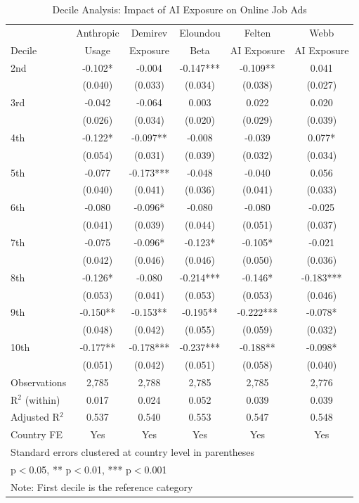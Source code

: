 \documentclass[11pt]{article}
\begin{document}
\begin{table}[H]
\centering
\caption{Decile Analysis: Impact of AI Exposure on Online Job Ads}
\begin{tabular}{lccccc}
\hline\hline
 & Anthropic & Demirev & Eloundou & Felten & Webb \\
Decile & Usage & Exposure & Beta & AI Exposure & AI Exposure \\
\midrule
2nd & -0.102* & -0.004 & -0.147*** & -0.109** & 0.041 \\
 & (0.040) & (0.033) & (0.034) & (0.038) & (0.027) \\
3rd & -0.042 & -0.064 & 0.003 & 0.022 & 0.020 \\
 & (0.026) & (0.034) & (0.020) & (0.029) & (0.039) \\
4th & -0.122* & -0.097** & -0.008 & -0.039 & 0.077* \\
 & (0.054) & (0.031) & (0.039) & (0.032) & (0.034) \\
5th & -0.077 & -0.173*** & -0.048 & -0.040 & 0.056 \\
 & (0.040) & (0.041) & (0.036) & (0.041) & (0.033) \\
6th & -0.080 & -0.096* & -0.080 & -0.080 & -0.025 \\
 & (0.041) & (0.039) & (0.044) & (0.051) & (0.037) \\
7th & -0.075 & -0.096* & -0.123* & -0.105* & -0.021 \\
 & (0.042) & (0.046) & (0.046) & (0.050) & (0.036) \\
8th & -0.126* & -0.080 & -0.214*** & -0.146* & -0.183*** \\
 & (0.053) & (0.041) & (0.053) & (0.053) & (0.046) \\
9th & -0.150** & -0.153** & -0.195** & -0.222*** & -0.078* \\
 & (0.048) & (0.042) & (0.055) & (0.059) & (0.032) \\
10th & -0.177** & -0.178*** & -0.237*** & -0.188** & -0.098* \\
 & (0.051) & (0.042) & (0.051) & (0.058) & (0.040) \\
\midrule
Observations & 2,785 & 2,788 & 2,785 & 2,785 & 2,776 \\
R$^2$ (within) & 0.017 & 0.024 & 0.052 & 0.039 & 0.039 \\
Adjusted R$^2$ & 0.537 & 0.540 & 0.553 & 0.547 & 0.548 \\
Country FE & Yes & Yes & Yes & Yes & Yes \\
\hline\hline
\multicolumn{6}{l}{\footnotesize Standard errors clustered at country level in parentheses} \\
\multicolumn{6}{l}{\footnotesize * p$<$0.05, ** p$<$0.01, *** p$<$0.001} \\
\multicolumn{6}{l}{\footnotesize Note: First decile is the reference category} \\
\end{tabular}
\label{table:decile_models}
\end{table}
\end{document}
